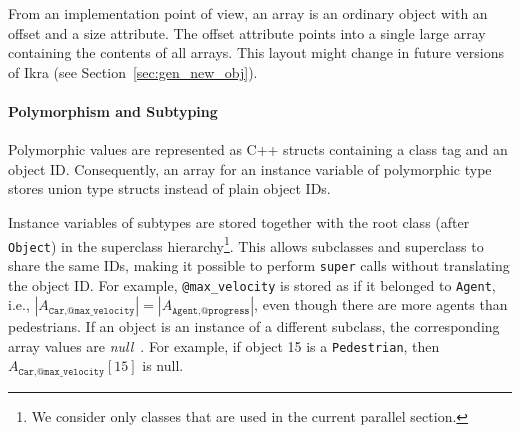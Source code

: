 \documentclass[preprint]{sigplanconf}
\begin{document}
From an implementation point of view, an array is an ordinary object with an offset and a size attribute. The offset attribute points into a single large array containing the contents of all arrays. This layout might change in future versions of Ikra (see Section~\ref{sec:gen_new_obj}).

\paragraph{Polymorphism and Subtyping}
Polymorphic values are represented as C++ structs containing a class tag and an object ID. Consequently, an array for an instance variable of polymorphic type stores union type structs instead of plain object IDs.

Instance variables of subtypes are stored together with the root class (after \texttt{Object}) in the superclass hierarchy\footnote{We consider only classes that are used in the current parallel section.}. This allows subclasses and superclass to share the same IDs, making it possible to perform \texttt{super} calls without translating the object ID. For example, \texttt{@max\_velocity} is stored as if it belonged to \texttt{Agent}, i.e., $|A_{\texttt{Car}, \texttt{@max\_velocity}}| = |A_{\texttt{Agent}, \texttt{@progress}}|$, even though there are more agents than pedestrians. If an object is an instance of a different subclass, the corresponding array values are \emph{null}~\cite{Mattis:2015:COI:2814228.2814230}. For example, if object 15 is a \texttt{Pedestrian}, then $A_{\texttt{Car}, \texttt{@max\_velocity}}[15]$ is null.

\end{document}

